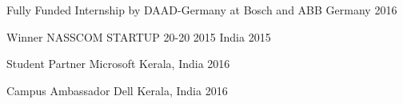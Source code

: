 



\begin{cvhonors}

  \cvhonor
    {Fully Funded Internship by DAAD-Germany} %
    {at Bosch and ABB} %
    {Germany} %
    {2016} %

\end{cvhonors}




\begin{cvhonors}


  \cvhonor
    {Winner} %
    {NASSCOM STARTUP 20-20 2015} %
    {India} %
    {2015} %


  \cvhonor
    {Student Partner} %
    {Microsoft} %
    {Kerala, India} %
    {2016} %


  \cvhonor
    {Campus Ambassador} %
    {Dell} %
    {Kerala, India} %
    {2016} %

\end{cvhonors}

